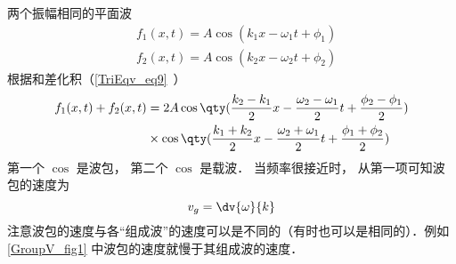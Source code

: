 两个振幅相同的平面波
\begin{equation}
\begin{aligned}
&f_1(x,t) = A\cos(k_1 x - \omega_1 t + \phi_1)\\
&f_2(x,t) = A\cos(k_2 x - \omega_2 t + \phi_2)
\end{aligned}
\end{equation}
根据和差化积（\autoref{TriEqv_eq9}~）
\begin{equation}
\begin{aligned}
f_1(x,t) + f_2(x,t) &= 2 A \cos \qty(\frac{k_2-k_1}{2}x - \frac{\omega_2-\omega_1}{2}t + \frac{\phi_2 - \phi_1}{2})\\
& \times \cos \qty(\frac{k_1+k_2}{2}x - \frac{\omega_{2}+\omega_{1}}{2}t + \frac{\phi_1 + \phi_2}{2})
\end{aligned}
\end{equation}
第一个 $\cos$ 是波包， 第二个 $\cos$ 是载波． 当频率很接近时， 从第一项可知波包的速度为
\begin{equation}
v_g = \dv{\omega}{k}
\end{equation}
注意波包的速度与各“组成波”的速度可以是不同的（有时也可以是相同的）．例如\autoref{GroupV_fig1} 中波包的速度就慢于其组成波的速度．
